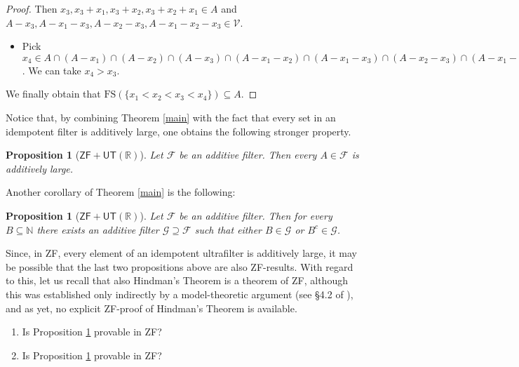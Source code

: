 \documentclass{amsart}
\newtheorem{proposition}[theorem]{Proposition}
\theoremstyle{definition}
\theoremstyle{remark}
\def\F{\mathscr{F}}
\def\G{\mathscr{G}}
\def\V{\mathscr{V}}
\def\N{\mathbb{N}}
\def\R{\mathbb{R}}
\begin{document}
\begin{proof}
Then $x_3,x_3+x_1,x_3+x_2,x_3+x_2+x_1\in A$ and
$A-x_3,A-x_1-x_3,A-x_2-x_3,A-x_1-x_2-x_3\in\V$.

\begin{itemize}
\item
Pick $x_4\in A
\cap(A-x_1)
\cap(A-x_2)\cap(A-x_3)\cap
(A-x_1-x_2)\cap(A-x_1-x_3)\cap (A-x_2-x_3)
\cap(A-x_1-x_2-x_3)\in\V$.
We can take $x_4>x_3$.
\end{itemize}

We finally obtain that $\text{FS}(\{x_1<x_2<x_3<x_4\})\subseteq A$.
\end{proof}

Notice that, by combining Theorem \ref{main}
with the fact that every set in
an idempotent filter is additively large,
one obtains the following stronger property.

\begin{proposition}[$\textsf{ZF}+\textsf{UT}(\R)$]\label{additivehindman}
Let $\F$ be an additive filter. Then every $A\in\F$
is additively large.
\end{proposition}

Another corollary of Theorem \ref{main} is the following:

\begin{proposition}[$\textsf{ZF}+\textsf{UT}(\R)$]\label{extendingadditive}
Let $\F$ be an additive filter. Then for every $B\subseteq\N$
there exists an additive filter $\G\supseteq\F$ such that
either $B\in\G$ or $B^c\in\G$.
\end{proposition}

Since, in \textsf{ZF}, every element of an idempotent ultrafilter 
is additively large, it may be possible that the last two propositions
above are also \textsf{ZF}-results. With regard to this,
let us recall that also Hindman's Theorem is a theorem
of \textsf{ZF}, although
this was established only indirectly by a model-theoretic argument
(see \S 4.2 of \cite{c}), and as yet, no explicit 
\textsf{ZF}-proof of Hindman's Theorem is available.

\smallskip
\begin{enumerate}
\item
Is Proposition \ref{additivehindman}
provable in \textsf{ZF}?

\smallskip
\item
Is Proposition \ref{extendingadditive}
provable in \textsf{ZF}?
\end{enumerate}

\end{document}
